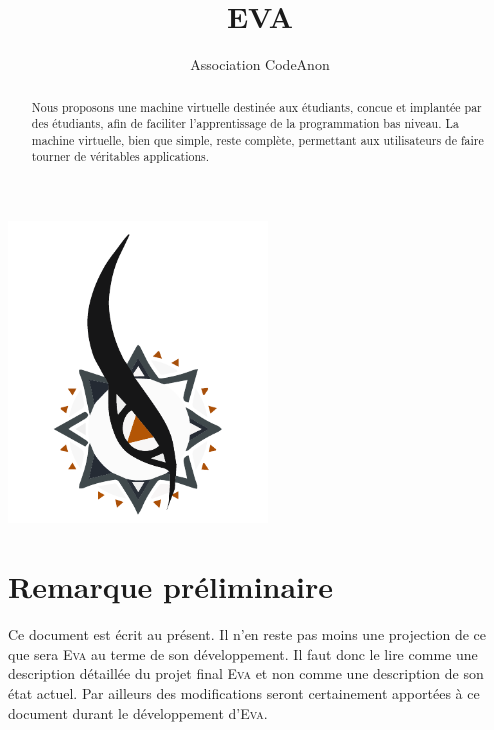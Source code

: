 \documentclass[11pt,twoside]{article}
\newcommand{\noun}[1]{\textsc{#1}}
\begin{document}
\title{EVA}
\author{Association CodeAnon}

\maketitle
\begin{abstract}
  Nous proposons une machine virtuelle destinée aux étudiants, concue et implantée par des étudiants, afin de faciliter l'apprentissage de la programmation bas niveau. La machine virtuelle, bien que simple, reste complète, permettant aux utilisateurs de faire tourner de véritables applications.
\end{abstract}
\vfill
\begin{center}
  \includegraphics[height=8cm]{logo_graph.pdf}
\end{center}
\vfill
\cleardoublepage

\hspace{0pt}
\vfill

\section*{Remarque préliminaire}

Ce document est écrit au présent. Il n'en reste pas moins une projection de ce que sera \noun{Eva} au terme de son développement. Il faut donc le lire comme une description détaillée du projet final \noun{Eva} et non comme une description de son état actuel. Par ailleurs des modifications seront certainement apportées à ce document durant le développement d'\noun{Eva}.

\vfill
\hspace{0pt}

\clearpage

\tableofcontents
\cleardoublepage
\end{document}
